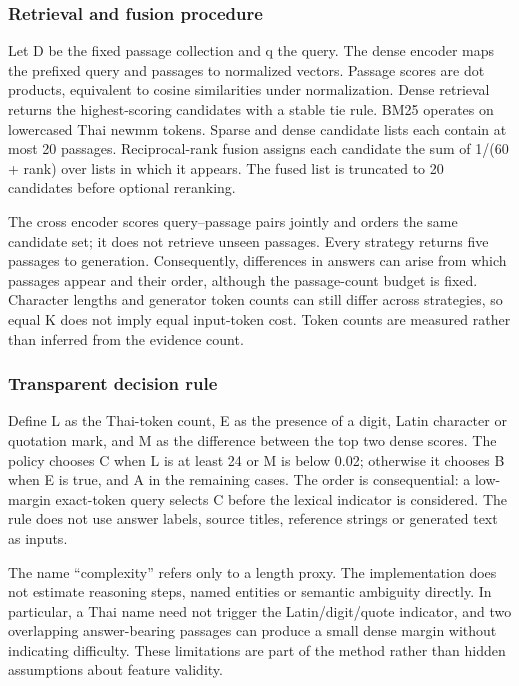 \documentclass[10pt,a4paper]{article}
\begin{document}
\hypertarget{retrieval-and-fusion-procedure}{%
\subsubsection{Retrieval and fusion
procedure}\label{retrieval-and-fusion-procedure}}

Let D be the fixed passage collection and q the query. The dense encoder
maps the prefixed query and passages to normalized vectors. Passage
scores are dot products, equivalent to cosine similarities under
normalization. Dense retrieval returns the highest-scoring candidates
with a stable tie rule. BM25 operates on lowercased Thai newmm tokens.
Sparse and dense candidate lists each contain at most 20 passages.
Reciprocal-rank fusion assigns each candidate the sum of 1/(60 + rank)
over lists in which it appears. The fused list is truncated to 20
candidates before optional reranking.

The cross encoder scores query--passage pairs jointly and orders the
same candidate set; it does not retrieve unseen passages. Every strategy
returns five passages to generation. Consequently, differences in
answers can arise from which passages appear and their order, although
the passage-count budget is fixed. Character lengths and generator token
counts can still differ across strategies, so equal K does not imply
equal input-token cost. Token counts are measured rather than inferred
from the evidence count.

\hypertarget{transparent-decision-rule}{%
\subsubsection{Transparent decision
rule}\label{transparent-decision-rule}}

Define L as the Thai-token count, E as the presence of a digit, Latin
character or quotation mark, and M as the difference between the top two
dense scores. The policy chooses C when L is at least 24 or M is below
0.02; otherwise it chooses B when E is true, and A in the remaining
cases. The order is consequential: a low-margin exact-token query
selects C before the lexical indicator is considered. The rule does not
use answer labels, source titles, reference strings or generated text as
inputs.

The name ``complexity'' refers only to a length proxy. The
implementation does not estimate reasoning steps, named entities or
semantic ambiguity directly. In particular, a Thai name need not trigger
the Latin/digit/quote indicator, and two overlapping answer-bearing
passages can produce a small dense margin without indicating difficulty.
These limitations are part of the method rather than hidden assumptions
about feature validity.
\end{document}
